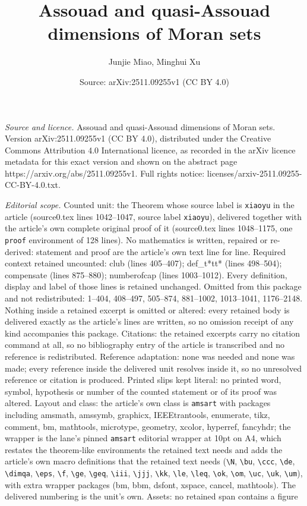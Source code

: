 \documentclass[10pt,a4paper]{amsart}
\title[Assouad and quasi-Assouad dimensions of Moran sets]{Assouad and quasi-Assouad dimensions of Moran sets}
\author{Junjie Miao, Minghui Xu}
\date{Source: arXiv:2511.09255v1 (CC BY 4.0)}
\begin{document}
\maketitle

\noindent\emph{Source and licence.} Assouad and quasi-Assouad dimensions of Moran sets. Version arXiv:2511.09255v1 (CC BY 4.0), distributed under the Creative Commons Attribution 4.0 International licence, as recorded in the arXiv licence metadata for this exact version and shown on the abstract page https://arxiv.org/abs/2511.09255v1. Full rights notice: licenses/arxiv-2511.09255-CC-BY-4.0.txt.\par\smallskip

\noindent\textit{Editorial scope.} Counted unit: the Theorem whose source label is \texttt{xiaoyu} in the article (source0.tex lines 1042--1047, source label \texttt{xiaoyu}), delivered together with the article's own complete original proof of it (source0.tex lines 1048--1175, one \texttt{proof} environment of 128 lines). No mathematics is written, repaired or re-derived: statement and proof are the article's own text line for line. Required context retained uncounted: club (lines 405--407); def\_t*tt* (lines 498--504); compensate (lines 875--880); numberofcap (lines 1003--1012). Every definition, display and label of those lines is retained unchanged. Omitted from this package and not redistributed: 1--404, 408--497, 505--874, 881--1002, 1013--1041, 1176--2148. Nothing inside a retained excerpt is omitted or altered: every retained body is delivered exactly as the article's lines are written, so no omission receipt of any kind accompanies this package. Citations: the retained excerpts carry no citation command at all, so no bibliography entry of the article is transcribed and no reference is redistributed. Reference adaptation: none was needed and none was made; every reference inside the delivered unit resolves inside it, so no unresolved reference or citation is produced. Printed slips kept literal: no printed word, symbol, hypothesis or number of the counted statement or of its proof was altered. Layout and class: the article's own class is \texttt{amsart} with packages including amsmath, amssymb, graphicx, IEEEtrantools, enumerate, tikz, comment, bm, mathtools, microtype, geometry, xcolor, hyperref, fancyhdr; the wrapper is the lane's pinned \texttt{amsart} editorial wrapper at 10pt on A4, which restates the theorem-like environments the retained text needs and adds the article's own macro definitions that the retained text needs (\texttt{\textbackslash N}, \texttt{\textbackslash bu}, \texttt{\textbackslash ccc}, \texttt{\textbackslash de}, \texttt{\textbackslash dimqa}, \texttt{\textbackslash eps}, \texttt{\textbackslash f}, \texttt{\textbackslash ge}, \texttt{\textbackslash geq}, \texttt{\textbackslash iii}, \texttt{\textbackslash jjj}, \texttt{\textbackslash kk}, \texttt{\textbackslash le}, \texttt{\textbackslash leq}, \texttt{\textbackslash ok}, \texttt{\textbackslash om}, \texttt{\textbackslash uc}, \texttt{\textbackslash uk}, \texttt{\textbackslash um}), with extra wrapper packages (bm, bbm, dsfont, xspace, cancel, mathtools). The delivered numbering is the unit's own. Assets: no retained span contains a figure 
\end{document}
